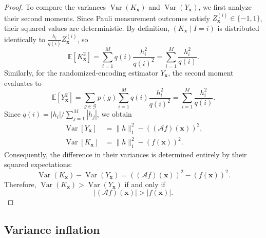 \documentclass[%
 reprint,
 amsmath,amssymb,
 aps,
 pra,
]{revtex4-2}
\theoremstyle{definition}
\begin{document}
\begin{proof}
To compare the variances \(\operatorname{Var}(K_{\bm{x}})\) and \(\operatorname{Var}(Y_{\bm{x}})\), we first analyze their second moments. Since Pauli measurement outcomes satisfy \(Z_{\bm{x}}^{(i)} \in \{-1, 1\}\), their squared values are deterministic. By definition, \((K_{\bm{x}} \mid I=i)\) is distributed identically to \(\frac{h_i}{q(i)} Z_{\bm{x}}^{(i)}\), so
\begin{equation}
\mathbb{E}\left[K_{\bm{x}}^2\right]
= \sum_{i=1}^M q(i) \frac{h_i^2}{q(i)^2}
= \sum_{i=1}^M \frac{h_i^2}{q(i)}.
\end{equation}
Similarly, for the randomized-encoding estimator \(Y_{\bm{x}}\), the second moment evaluates to
\begin{equation}
\mathbb{E}\left[Y_{\bm{x}}^2\right]
= \sum_{g \in \mathcal{G}} p(g) \sum_{i=1}^M q(i) \frac{h_i^2}{q(i)^2}
= \sum_{i=1}^M \frac{h_i^2}{q(i)}.
\end{equation}
Since \(q(i) = |h_i| / \sum_{j=1}^M |h_j|\), we obtain
\begin{align}
\operatorname{Var}\left[Y_{\bm{x}}\right]&=
\|h\|_1^2-((\mathcal{A}f)(\bm{x}))^2,\\
\operatorname{Var}[K_{\bm{x}}]&=
\|h\|_1^2-(f(\bm{x}))^2.
\end{align}
Consequently, the difference in their variances is determined entirely by their squared expectations:
\begin{equation}
\operatorname{Var}(K_{\bm{x}}) - \operatorname{Var}(Y_{\bm{x}})= ((\mathcal{A}f)(\bm{x}))^2 - (f(\bm{x}))^2.
\end{equation}
Therefore, \(\operatorname{Var}(K_{\bm{x}}) > \operatorname{Var}(Y_{\bm{x}})\) if and only if
\begin{equation}
|(\mathcal{A}f)(\bm{x})| > |f(\bm{x})|.
\end{equation}
\end{proof}

\subsection{Variance inflation}
\label{sec:variance_inflation}
\end{document}
